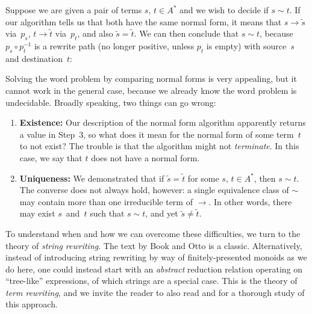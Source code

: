 \documentclass[../generics]{subfiles}
\begin{document}
Suppose we are given a pair of terms $s$, $t\in A^*$ and we wish to decide if $s\sim t$. If our algorithm tells us that both have the same normal form, it means that $s\rightarrow \tilde{s}$ via~$p_s$, $t\rightarrow \tilde{t}$ via~$p_t$, and also $\tilde{s}=\tilde{t}$. We can then conclude that $s\sim t$, because $p_s \circ p_t^{-1}$ is a rewrite path (no longer positive, unless $p_t$ is empty) with source~$s$ and destination~$t$:

\begin{center}
\end{center}

Solving the word problem by comparing normal forms is very appealing, but it cannot work in the general case, because we already know the word problem is undecidable. Broadly speaking, two things can go wrong:
\begin{enumerate}
\item \textbf{Existence:} Our description of the normal form algorithm apparently returns a value in Step~3, so what does it mean for the normal form of some term~$t$ to not exist? The trouble is that the algorithm might not \emph{terminate}. In this case, we say that $t$ does not have a normal form.
\item \textbf{Uniqueness:} We demonstrated that if $\tilde{s}=\tilde{t}$ for some $s$, $t\in A^*$, then $s\sim t$. The converse does not always hold, however: a single equivalence class of $\sim$ may contain more than one irreducible term of $\rightarrow$. In other words, there may exist $s$~and~$t$ such that $s\sim t$, and yet $\tilde{s}\neq \tilde{t}$.
\end{enumerate}
To understand when and how we can overcome these difficulties, we turn to the theory of \emph{string rewriting}. The text by Book and Otto \cite{book2012string} is a classic. Alternatively, instead of introducing string rewriting by way of finitely-presented monoids as we do here, one could instead start with an \emph{abstract} reduction relation operating on ``tree-like'' expressions, of which strings are a special case. This is the theory of \emph{term rewriting}, and we invite the reader to also read \cite{andallthat} and \cite{formalmans6} for a thorough study of this approach.
\end{document}
